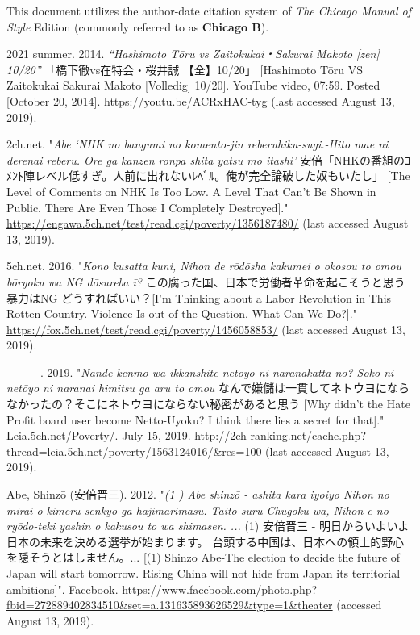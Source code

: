 \documentclass[10pt,british,A4paper,oneside]{memoir}
\begin{document}
\setlength{\parindent}{-0.2in} \setlength{\leftskip}{0.2in}
\setlength{\parskip}{0em} \noindent

This document utilizes the author-date citation system of \emph{The
Chicago Manual of Style}  Edition (commonly referred to as
\textbf{Chicago B}).

\vspace{4mm} \setlength{\parskip}{0em} \footnotesize

\hypertarget{refs}{}
\hypertarget{ref-2021_summer_vs_2014}{}
2021 summer. 2014. \emph{“Hashimoto Tōru vs Zaitokukai・Sakurai Makoto [zen] 10/20”} 「橋下徹vs在特会・桜井誠 【全】10/20」 [Hashimoto Tōru VS Zaitokukai  Sakurai Makoto [Volledig] 10/20]. YouTube video, 07:59. Posted [October 20, 2014]. \url{https://youtu.be/ACRxHAC-tyg} (last accessed August 13, 2019).

\hypertarget{ref-2ch.net_eng._2012}{}
2ch.net. "\emph{Abe `NHK no bangumi no komento-jin reberuhiku-sugi.-Hito mae ni derenai reberu. Ore ga kanzen ronpa shita yatsu mo itashi'} 安倍「NHKの番組のｺﾒﾝﾄ陣レベル低すぎ。人前に出れないﾚﾍﾞﾙ。俺が完全論破した奴もいたし」 [The Level of Comments on NHK Is Too Low. A Level That Can't Be Shown in Public. There Are Even Those I Completely Destroyed]."
\url{https://engawa.5ch.net/test/read.cgi/poverty/1356187480/} (last accessed August 13, 2019).

\hypertarget{ref-5ch.net_eng._2016}{}
5ch.net. 2016. "\emph{Kono kusatta kuni, Nihon de rōdōsha kakumei o okosou to omou bōryoku wa NG dōsureba ī?} この腐った国、日本で労働者革命を起こそうと思う 暴力はNG どうすればいい？[I’m Thinking about a Labor Revolution in This Rotten Country. Violence Is out of the Question. What Can We Do?]."
\url{https://fox.5ch.net/test/read.cgi/poverty/1456058853/} (last accessed August 13, 2019).

\hypertarget{ref-5ch.net_eng._2019}{}
---------. 2019. "\emph{Nande kenmō wa ikkanshite netōyo ni naranakatta no? Soko ni netōyo ni naranai himitsu ga aru to omou} なんで嫌儲は一貫してネトウヨにならなかったの？そこにネトウヨにならない秘密があると思う [Why didn't the Hate Profit board user become Netto-Uyoku? I think there lies a secret for that]." Leia.5ch.net/Poverty/. July 15, 2019.
\url{http://2ch-ranking.net/cache.php?thread=leia.5ch.net/poverty/1563124016/\&res=100} (last accessed August 13, 2019).

\hypertarget{ref-abe_1_2012}{}
Abe, Shinzō (安倍晋三). 2012. "\emph{(1 ) Abe shinzō - ashita kara iyoiyo Nihon no mirai o kimeru senkyo ga hajimarimasu. Taitō suru Chūgoku wa, Nihon e no ryōdo-teki yashin o kakusou to wa shimasen. ...} (1) 安倍晋三 - 明日からいよいよ日本の未来を決める選挙が始まります。 台頭する中国は、日本への領土的野心を隠そうとはしません。... [(1) Shinzo Abe-The election to decide the future of Japan will start tomorrow. Rising China will not hide from Japan its territorial ambitions]". Facebook.
\url{https://www.facebook.com/photo.php?fbid=272889402834510\&set=a.131635893626529\&type=1\&theater} (accessed August 13, 2019).
\end{document}
